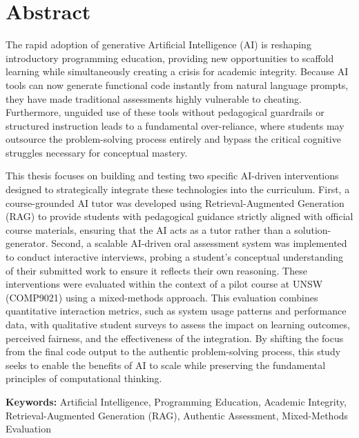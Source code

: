 \chapter*{Abstract}\label{abstract}
The rapid adoption of generative Artificial Intelligence (AI) is reshaping introductory programming education, providing new opportunities to scaffold learning while simultaneously creating a crisis for academic integrity. Because AI tools can now generate functional code instantly from natural language prompts, they have made traditional assessments highly vulnerable to cheating. Furthermore, unguided use of these tools without pedagogical guardrails or structured instruction leads to a fundamental over-reliance, where students may outsource the problem-solving process entirely and bypass the critical cognitive struggles necessary for conceptual mastery.

This thesis focuses on building and testing two specific AI-driven interventions designed to strategically integrate these technologies into the curriculum. First, a course-grounded AI tutor was developed using Retrieval-Augmented Generation (RAG) to provide students with pedagogical guidance strictly aligned with official course materials, ensuring that the AI acts as a tutor rather than a solution-generator. Second, a scalable AI-driven oral assessment system was implemented to conduct interactive interviews, probing a student’s conceptual understanding of their submitted work to ensure it reflects their own reasoning. These interventions were evaluated within the context of a pilot course at UNSW (COMP9021) using a mixed-methods approach. This evaluation combines quantitative interaction metrics, such as system usage patterns and performance data, with qualitative student surveys to assess the impact on learning outcomes, perceived fairness, and the effectiveness of the integration. By shifting the focus from the final code output to the authentic problem-solving process, this study seeks to enable the benefits of AI to scale while preserving the fundamental principles of computational thinking.

\noindent\textbf{Keywords:} Artificial Intelligence, Programming Education, Academic Integrity, Retrieval-Augmented Generation (RAG), Authentic Assessment, Mixed-Methods Evaluation